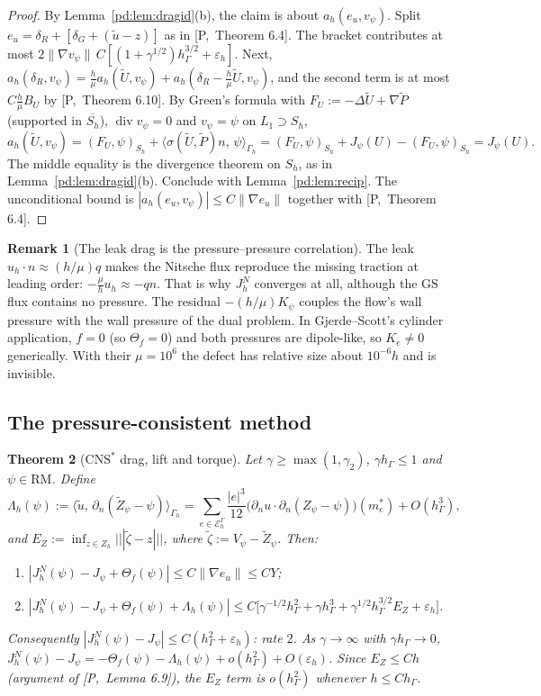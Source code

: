 \documentclass[11pt,reqno]{amsart}
\theoremstyle{plain}
\newtheorem{theorem}{Theorem}[section]
\theoremstyle{definition}
\newtheorem{remark}[theorem]{Remark}
\newcommand{\hG}{h_\Gamma}
\newcommand{\Gh}{\Gamma_h}
\newcommand{\EG}{\mathcal E_h^\Gamma}
\newcommand{\Zh}{Z_h}
\newcommand{\dn}{\partial_n}
\newcommand{\ut}{\tilde u}
\newcommand{\ip}[2]{\langle #1,\, #2\rangle}
\newcommand{\tnorm}[1]{|\!|\!|#1|\!|\!|}
\newcommand{\norm}[1]{\lVert #1\rVert}
\newcommand{\GS}{\mathrm{GS}}
\newcommand{\CNS}{\mathrm{CNS}^\ast}
\newcommand{\eps}{\varepsilon_h}
\renewcommand{\div}{\operatorname{div}}
\newcommand{\Pref}[1]{\textup{[P,~#1]}}
\newcommand{\Lay}{L_1}
\newcommand{\RM}{\mathrm{RM}}
\begin{document}
\begin{proof}
By Lemma~\ref{pd:lem:dragid}(b), the claim is about $a_h(e_u,v_\psi)$. Split $e_u=\delta_R+[\delta_G+(\ut-z)]$ as in \Pref{Theorem 6.4}. The bracket contributes at most $2\norm{\nabla v_\psi}\,C[(1+\gamma^{1/2})\hG^{3/2}+\eps]$. Next, $a_h(\delta_R,v_\psi)=\frac h\mu a_h(\tilde U,v_\psi)+a_h(\delta_R-\frac h\mu\tilde U,v_\psi)$, and the second term is at most $C\frac h\mu B_U$ by \Pref{Theorem 6.10}. By Green's formula with $F_U:=-\Delta\tilde U+\nabla\tilde P$ (supported in $\overline{S_h}$), $\div v_\psi=0$ and $v_\psi=\psi$ on $\Lay\supset S_h$,
\[
a_h(\tilde U,v_\psi)=(F_U,\psi)_{S_h}+\ip{\sigma(\tilde U,\tilde P)n}\psi_{\Gh}=(F_U,\psi)_{S_h}+J_\psi(U)-(F_U,\psi)_{S_h}=J_\psi(U).
\]
The middle equality is the divergence theorem on $S_h$, as in Lemma~\ref{pd:lem:dragid}(b). Conclude with Lemma~\ref{pd:lem:recip}. The unconditional bound is $|a_h(e_u,v_\psi)|\le C\norm{\nabla e_u}$ together with \Pref{Theorem 6.4}.
\end{proof}

\begin{remark}[The leak drag is the pressure--pressure correlation]\label{pd:rem:leakdrag}
The leak $u_h\cdot n\approx(h/\mu)q$ makes the Nitsche flux reproduce the missing traction at leading order: $-\frac\mu hu_h\approx-qn$. That is why $J^N_h$ converges at all, although the $\GS$ flux contains no pressure. The residual $-(h/\mu)K_\psi$ couples the flow's wall pressure with the wall pressure of the dual problem. In Gjerde--Scott's cylinder application, $f=0$ (so $\Theta_f=0$) and both pressures are dipole-like, so $K_e\ne0$ generically. With their $\mu=10^6$ the defect has relative size about $10^{-6}h$ and is invisible.
\end{remark}

\subsection{The pressure-consistent method}

\begin{theorem}[$\CNS$ drag, lift and torque]\label{pd:thm:cnsdrag}
Let $\gamma\ge\max(1,\gamma_2)$, $\gamma\hG\le1$ and $\psi\in\RM$. Define
\[
\Lambda_h(\psi):=\ip{\ut}{\dn(\tilde Z_\psi-\psi)}_{\Gh}=\sum_{e\in\EG}\frac{|e|^3}{12}\bigl(\dn u\cdot\dn(Z_\psi-\psi)\bigr)(m_e^\ast)+O(\hG^3),
\]
and $E_Z:=\inf_{z\in\Zh}\tnorm{\tilde\zeta-z}$, where $\tilde\zeta:=V_\psi-\tilde Z_\psi$. Then:
\begin{enumerate}[label=(\alph*)]
\item $|J^N_h(\psi)-J_\psi+\Theta_f(\psi)|\le C\norm{\nabla e_u}\le CY$;
\item $|J^N_h(\psi)-J_\psi+\Theta_f(\psi)+\Lambda_h(\psi)|\le C\bigl[\gamma^{-1/2}\hG^2+\gamma\hG^3+\gamma^{1/2}\hG^{3/2}E_Z+\eps\bigr]$.
\end{enumerate}
Consequently $|J^N_h(\psi)-J_\psi|\le C(\hG^2+\eps)$: rate $2$. As $\gamma\to\infty$ with $\gamma\hG\to0$, $J^N_h(\psi)-J_\psi=-\Theta_f(\psi)-\Lambda_h(\psi)+o(\hG^2)+O(\eps)$. Since $E_Z\le Ch$ (argument of \Pref{Lemma 6.9}), the $E_Z$ term is $o(\hG^2)$ whenever $h\le C\hG$.
\end{theorem}
\end{document}
